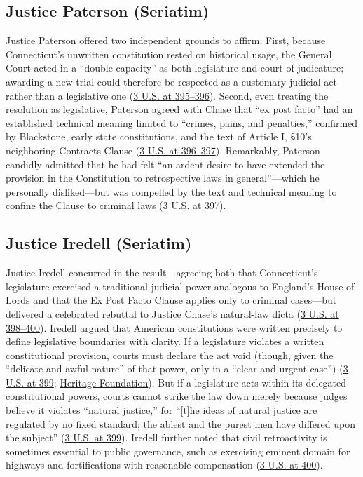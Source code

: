 \documentclass[12pt]{article}
\begin{document}
\subsection{Justice Paterson (Seriatim)}

Justice Paterson offered two independent grounds to affirm. First, because Connecticut's unwritten constitution rested on historical usage, the General Court acted in a ``double capacity'' as both legislature and court of judicature; awarding a new trial could therefore be respected as a customary judicial act rather than a legislative one (\href{https://supreme.justia.com/cases/federal/us/3/386/}{3 U.S. at 395--396}). Second, even treating the resolution as legislative, Paterson agreed with Chase that ``ex post facto'' had an established technical meaning limited to ``crimes, pains, and penalties,'' confirmed by Blackstone, early state constitutions, and the text of Article I, \S 10's neighboring Contracts Clause (\href{https://supreme.justia.com/cases/federal/us/3/386/}{3 U.S. at 396--397}). Remarkably, Paterson candidly admitted that he had felt ``an ardent desire to have extended the provision in the Constitution to retrospective laws in general''---which he personally disliked---but was compelled by the text and technical meaning to confine the Clause to criminal laws (\href{https://supreme.justia.com/cases/federal/us/3/386/}{3 U.S. at 397}).

\subsection{Justice Iredell (Seriatim)}

Justice Iredell concurred in the result---agreeing both that Connecticut's legislature exercised a traditional judicial power analogous to England's House of Lords and that the Ex Post Facto Clause applies only to criminal cases---but delivered a celebrated rebuttal to Justice Chase's natural-law dicta (\href{https://supreme.justia.com/cases/federal/us/3/386/}{3 U.S. at 398--400}). Iredell argued that American constitutions were written precisely to define legislative boundaries with clarity. If a legislature violates a written constitutional provision, courts must declare the act void (though, given the ``delicate and awful nature'' of that power, only in a ``clear and urgent case'') (\href{https://supreme.justia.com/cases/federal/us/3/386/}{3 U.S. at 399}; \href{https://www.heritage.org/courts/report/judicial-supremacy-and-our-two-constitutions-reflections-the-historical-record}{Heritage Foundation}). But if a legislature acts within its delegated constitutional powers, courts cannot strike the law down merely because judges believe it violates ``natural justice,'' for ``[t]he ideas of natural justice are regulated by no fixed standard; the ablest and the purest men have differed upon the subject'' (\href{https://supreme.justia.com/cases/federal/us/3/386/}{3 U.S. at 399}). Iredell further noted that civil retroactivity is sometimes essential to public governance, such as exercising eminent domain for highways and fortifications with reasonable compensation (\href{https://supreme.justia.com/cases/federal/us/3/386/}{3 U.S. at 400}).
\end{document}
